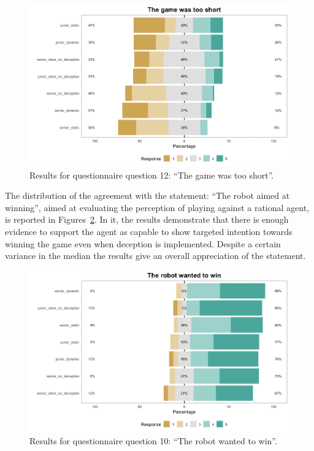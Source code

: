 \begin{figure}[h]
    \centering
    \includegraphics[draft=false, width=\linewidth]{images/06-deception/Q12}
    \caption{Results for questionnaire question 12: ``The game was too short''.}
    \label{fig:q12}
\end{figure}

The distribution of the agreement with the statement: ``The robot aimed at winning'', aimed at evaluating the perception of playing against a rational agent, is reported in Figures~\ref{fig:q10}. In it, the results demonstrate that there is enough evidence to support the agent as capable to show targeted intention towards winning the game even when deception is implemented. Despite a certain variance in the median the results give an overall appreciation of the statement. 

\begin{figure}[h]
    \centering
    \includegraphics[draft=false, width=\linewidth]{images/06-deception/Q10}
    \caption{Results for questionnaire question 10: ``The robot wanted to win''.}
    \label{fig:q10}
\end{figure}

